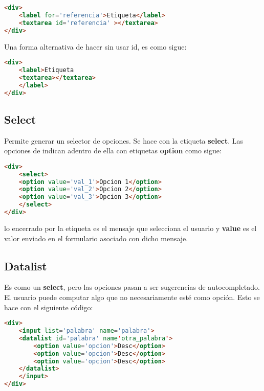 \documentclass[10pt,oneside]{article}
\begin{document}
\begin{multicols}{2}
\begin{itemize}
    \end{itemize}

    \begin{lstlisting}[language=HTML]
<div>
    <label for='referencia'>Etiqueta</label>
    <textarea id='referencia' ></textarea>
</div> 
    \end{lstlisting}

    Una forma alternativa de hacer sin usar id, es como sigue:

    \begin{lstlisting}[language=HTML]
<div>
    <label>Etiqueta
    <textarea></textarea>
    </label>
</div> 
    \end{lstlisting}

\subsection{Select}

    Permite generar un selector de opciones. Se hace con la etiqueta \textbf{select}. Las opciones de indican adentro de ella con etiquetas \textbf{option} como sigue:
    
    \begin{lstlisting}[language=HTML]
<div>
    <select>
    <option value='val_1'>Opcion 1</option>
    <option value='val_2'>Opcion 2</option>
    <option value='val_3'>Opcion 3</option>
    </select>
</div> 
    \end{lstlisting}

    lo encerrado por la etiqueta es el mensaje que selecciona el usuario y \textbf{value} es el valor enviado en el formulario asociado con dicho mensaje. 

\subsection{Datalist}

    Es como un \textbf{select}, pero las opciones pasan a ser sugerencias de autocompletado. El usuario puede computar algo que no necesariamente esté como opción. Esto se hace con el siguiente código:

    \begin{lstlisting}[language=HTML]
<div>
    <input list='palabra' name='palabra'>
    <datalist id='palabra' name'otra_palabra'>
        <option value='opcion'>Desc</option>
        <option value='opcion'>Desc</option>
        <option value='opcion'>Desc</option>        
    </datalist>
    </input>
</div>
    \end{lstlisting}


\end{multicols}
\end{document}
